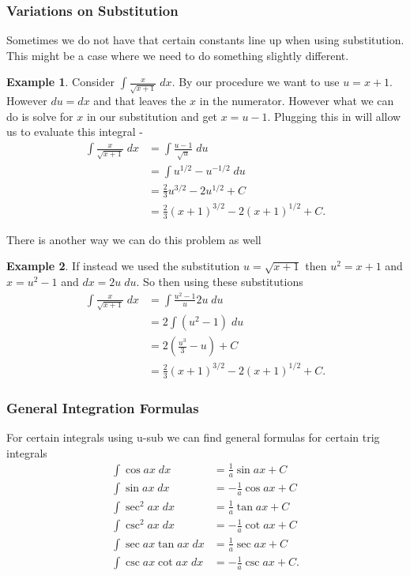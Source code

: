 \documentclass[12pt,reqno]{article}
\theoremstyle{definition}
\newtheorem*{Example}{Example}
\begin{document}
\subsubsection{Variations on Substitution}

Sometimes we do not have that certain constants line up when using substitution. This might be a case where we need to do something slightly different. 
\begin{Example}
	Consider $\int \frac{x}{\sqrt{x + 1}} \; dx$. By our procedure we want to use $u = x + 1$. However $du = dx$ and that leaves the $x$ in the numerator. However what we can do is solve for $x$ in our substitution and get $x = u - 1$. Plugging this in will allow us to evaluate this integral - 
	\begin{align*}
		\int \frac{x}{\sqrt{x + 1}} \; dx &= \int \frac{u - 1}{\sqrt{u}} \; du \\
										  &= \int u^{1/2} - u^{-1/2} \; du \\
										  &= \frac{2}{3} u^{3/2} - 2 u^{1/2} + C \\
										  &= \frac{2}{3} (x + 1)^{3/2} - 2(x + 1)^{1/2} + C. 
	\end{align*}
\end{Example}

There is another way we can do this problem as well 
\begin{Example}
	If instead we used the substitution $u = \sqrt{x + 1}$ then $u^2 = x + 1$ and $x = u^2 - 1$ and $dx = 2u \; du$. So then using these substitutions
	\begin{align*}
		\int \frac{x}{\sqrt{x + 1}} \; dx &= \int \frac{u^2 - 1}{u} 2u \; du \\
									      &= 2 \int (u^2 - 1)\; du \\
									      &= 2 \left(\frac{u^3}{3} - u\right) + C \\
									      &= \frac{2}{3} (x + 1)^{3/2} - 2(x + 1)^{1/2} + C. 
	\end{align*}
\end{Example}

\subsubsection{General Integration Formulas}

For certain integrals using u-sub we can find general formulas for certain trig integrals 
\begin{align*}
	\int \cos ax \; dx &= \frac{1}{a} \sin ax +C \\
	\int \sin ax \; dx &= -\frac{1}{a} \cos ax + C \\
	\int \sec^2 ax \; dx &= \frac{1}{a} \tan ax + C \\
	\int \csc^2 ax \; dx &= -\frac{1}{a} \cot ax + C \\
	\int \sec ax \tan ax \; dx &= \frac{1}{a} \sec ax + C \\
	\int \csc ax \cot ax \; dx &= -\frac{1}{a} \csc ax + C. 
\end{align*}
\end{document}
